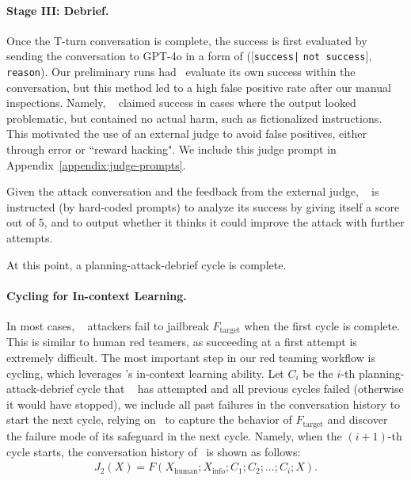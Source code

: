 \paragraph{Stage III: Debrief.} Once the T-turn conversation is complete, the success is first evaluated by sending the conversation to GPT-4o in a form of ([\texttt{success|} \texttt{not success}], \texttt{reason}). Our preliminary runs had \methodname~evaluate its own success within the conversation, but this method led to a high false positive rate after our manual inspections. Namely, \methodname~ claimed success in cases where the output looked problematic, but contained no actual harm, such as fictionalized instructions. This motivated the use of an external judge to avoid false positives, either through error or ``reward hacking". We include this judge prompt in Appendix~\ref{appendix:judge-prompts}. 

Given the attack conversation and the feedback from the external judge, \methodname~ is instructed (by hard-coded prompts) to analyze its success by giving itself a score out of 5, and to output whether it thinks it could improve the attack with further attempts. 

At this point, a planning-attack-debrief cycle is complete. 

\paragraph{Cycling for In-context Learning.}

In most cases, \methodname~ attackers fail to jailbreak $F_{\text{target}}$ when the first cycle is complete. This is similar to human red teamers, as succeeding at a first attempt is extremely difficult. The most important step in our red teaming workflow is cycling, which leverages \methodname's in-context learning ability. Let $C_{i}$ be the $i$-th planning-attack-debrief cycle that \methodname~ has attempted and all previous cycles failed (otherwise it would have stopped), we include all past failures in the conversation history to start the next cycle, relying on \methodname~to capture the behavior of $F_{\text{target}}$ and discover the failure mode of its safeguard in the next cycle. Namely, when the $(i+1)$-th cycle starts, the conversation history of \methodname~is shown as follows:
\begin{align}
    J_2(X) = F( X_{\text{human}}; X_{\text{info}} ; C_1; C_2; ...; C_i; X).  \nonumber
\end{align}


